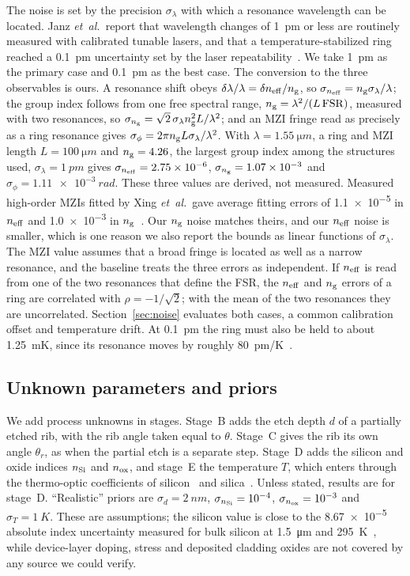 The noise is set by the precision $\sigma_\lambda$ with which a resonance wavelength can be located. Janz
\textit{et~al.}\ report that wavelength changes of \qty{1}{pm} or less are routinely measured with calibrated tunable
lasers, and that a temperature-stabilized ring reached a \qty{0.1}{pm} uncertainty set by the laser
repeatability~\cite{janz2023}. We take \qty{1}{pm} as the primary case and \qty{0.1}{pm} as the best case. The
conversion to the three observables is ours. A resonance shift obeys
$\delta\lambda/\lambda=\delta n_\mathrm{eff}/n_\mathrm{g}$, so $\sigma_{n_\mathrm{eff}}=n_\mathrm{g}\sigma_\lambda/\lambda$; the group index follows from
one free spectral range, $n_\mathrm{g}=\lambda^2/(L\,\mathrm{FSR})$, measured with two resonances, so
$\sigma_{n_\mathrm{g}}=\sqrt2\,\sigma_\lambda n_\mathrm{g}^2L/\lambda^2$; and an MZI fringe read as precisely as a ring resonance gives
$\sigma_\phi=2\pi n_\mathrm{g} L\sigma_\lambda/\lambda^2$. With $\lambda=\qty{1.55}{\micro m}$, a ring and MZI length
$L=\qty{100}{\micro m}$ and $n_\mathrm{g}=4.26$, the largest group index among the structures used, $\sigma_\lambda=\qty{1}{pm}$
gives $\sigma_{n_\mathrm{eff}}=\num{2.75e-6}$, $\sigma_{n_\mathrm{g}}=\num{1.07e-3}$ and $\sigma_\phi=\qty{1.11e-3}{rad}$. These
three values are derived, not measured. Measured high-order MZIs fitted by Xing \textit{et~al.}\ gave average
fitting errors of \num{1.1e-5} in $n_\mathrm{eff}$ and \num{1.0e-3} in $n_\mathrm{g}$~\cite{xing2018}. Our $n_\mathrm{g}$ noise matches theirs,
and our $n_\mathrm{eff}$ noise is smaller, which is one reason we also report the bounds as linear functions of
$\sigma_\lambda$. The MZI value assumes that a broad fringe is located as well as a narrow
resonance, and the baseline treats the three errors as independent. If $n_\mathrm{eff}$ is read from one of the two
resonances that define the FSR, the $n_\mathrm{eff}$ and $n_\mathrm{g}$ errors of a ring are correlated with $\rho=-1/\sqrt2$; with
the mean of the two resonances they are uncorrelated. Section~\ref{sec:noise} evaluates both cases, a common
calibration offset and temperature drift. At \qty{0.1}{pm} the ring must also be held to about \qty{1.25}{mK}, since its resonance moves
by roughly \qty{80}{pm/K}~\cite{janz2023}.

\subsection{Unknown parameters and priors}

We add process unknowns in stages. Stage~B adds the etch depth $d$ of a partially etched rib, with the rib angle
taken equal to $\theta$. Stage~C gives the rib its own angle $\theta_r$, as when the partial etch is a separate
step. Stage~D adds the silicon and oxide indices $n_\mathrm{Si}$ and $n_\mathrm{ox}$, and stage~E the temperature $T$, which enters
through the thermo-optic coefficients of silicon~\cite{frey2006} and silica~\cite{leviton2008}. Unless stated,
results are for stage~D. ``Realistic'' priors are $\sigma_d=\qty{2}{nm}$, $\sigma_{n_\mathrm{Si}}=10^{-4}$,
$\sigma_{n_\mathrm{ox}}=10^{-3}$ and $\sigma_T=\qty{1}{K}$. These are assumptions; the silicon value is close to the
\num{8.67e-5} absolute index uncertainty measured for bulk silicon at \qty{1.5}{\micro m} and
\qty{295}{K}~\cite{frey2006}, while device-layer doping, stress and deposited cladding oxides are not covered by any
source we could verify.

